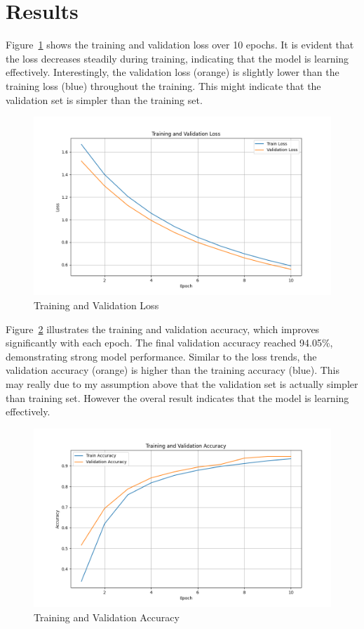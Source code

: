 \documentclass[a4paper,12pt]{article}
\begin{document}
\section*{Results}
Figure~\ref{fig:loss} shows the training and validation loss over 10 epochs. It is evident that the loss decreases steadily during training, indicating that the model is learning effectively. Interestingly, the validation loss (orange) is slightly lower than the training loss (blue) throughout the training. This might indicate that the validation set is simpler than the training set.

\begin{figure}[h!]
    \centering
    \includegraphics[width=1\textwidth]{train_val_loss_plot.png}
    \caption{Training and Validation Loss}
    \label{fig:loss}
\end{figure}

Figure~\ref{fig:accuracy} illustrates the training and validation accuracy, which improves significantly with each epoch. The final validation accuracy reached 94.05\%, demonstrating strong model performance. Similar to the loss trends, the validation accuracy (orange) is higher than the training accuracy (blue). This may really due to my assumption above that the validation set is actually simpler than training set. However the overal result indicates that the model is learning effectively.

\begin{figure}[h!]
    \centering
    \includegraphics[width=1\textwidth]{train_val_acc_plot.png}
    \caption{Training and Validation Accuracy}
    \label{fig:accuracy}
\end{figure}
\end{document}
